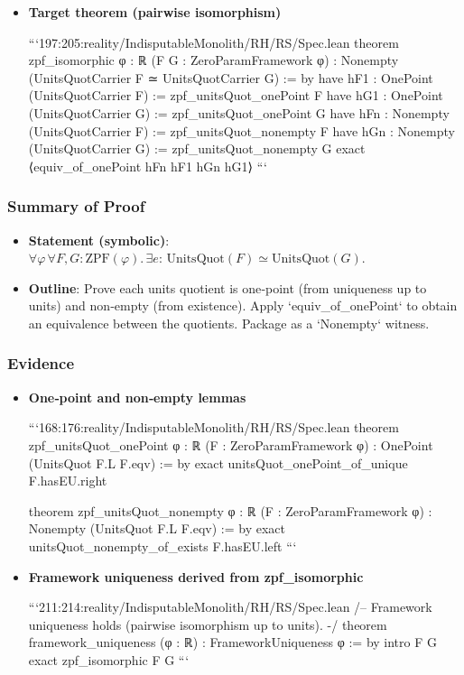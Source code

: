 \documentclass{article}
\begin{document}
\begin{itemize}[leftmargin=*]
  \item \textbf{Target theorem (pairwise isomorphism)}

```197:205:reality/IndisputableMonolith/RH/RS/Spec.lean
theorem zpf_isomorphic {φ : ℝ}
  (F G : ZeroParamFramework φ) :
  Nonempty (UnitsQuotCarrier F ≃ UnitsQuotCarrier G) := by
  have hF1 : OnePoint (UnitsQuotCarrier F) := zpf_unitsQuot_onePoint F
  have hG1 : OnePoint (UnitsQuotCarrier G) := zpf_unitsQuot_onePoint G
  have hFn : Nonempty (UnitsQuotCarrier F) := zpf_unitsQuot_nonempty F
  have hGn : Nonempty (UnitsQuotCarrier G) := zpf_unitsQuot_nonempty G
  exact ⟨equiv_of_onePoint hFn hF1 hGn hG1⟩
```
\end{itemize}

\subsubsection{Summary of Proof}
\begin{itemize}[leftmargin=*]
  \item \textbf{Statement (symbolic)}: \(\forall φ\,\forall F,G: \mathrm{ZPF}(φ).\,\exists e:\,\mathrm{UnitsQuot}(F) \simeq \mathrm{UnitsQuot}(G)\).
  \item \textbf{Outline}: Prove each units quotient is one‑point (from uniqueness up to units) and non‑empty (from existence). Apply `equiv\_of\_onePoint` to obtain an equivalence between the quotients. Package as a `Nonempty` witness.
\end{itemize}

\subsubsection{Evidence}
\begin{itemize}[leftmargin=*]
  \item \textbf{One‑point and non‑empty lemmas}

```168:176:reality/IndisputableMonolith/RH/RS/Spec.lean
theorem zpf_unitsQuot_onePoint {φ : ℝ} (F : ZeroParamFramework φ) :
  OnePoint (UnitsQuot F.L F.eqv) := by
  exact unitsQuot_onePoint_of_unique F.hasEU.right

theorem zpf_unitsQuot_nonempty {φ : ℝ} (F : ZeroParamFramework φ) :
  Nonempty (UnitsQuot F.L F.eqv) := by
  exact unitsQuot_nonempty_of_exists F.hasEU.left
```

  \item \textbf{Framework uniqueness derived from zpf\_isomorphic}

```211:214:reality/IndisputableMonolith/RH/RS/Spec.lean
/-- Framework uniqueness holds (pairwise isomorphism up to units). -/
 theorem framework_uniqueness (φ : ℝ) : FrameworkUniqueness φ := by
  intro F G
  exact zpf_isomorphic F G
```
\end{itemize}
\end{document}
